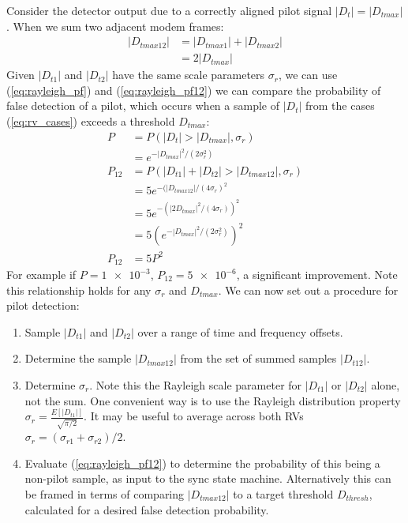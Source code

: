 \documentclass{article}
\begin{document}
Consider the detector output due to a correctly aligned pilot signal $|D_t|=|D_{tmax}|$. When we sum two adjacent modem frames:
\begin{equation}
\label{eq:pilot_sum}
\begin{split}
|D_{tmax12}| &= |D_{tmax1}| + |D_{tmax2}| \\
             &= 2|D_{tmax}|
\end{split}
\end{equation}
Given $|D_{t1}|$ and $|D_{t2}|$ have the same scale parameters $\sigma_r$, we can use (\ref{eq:rayleigh_pf}) and (\ref{eq:rayleigh_pf12}) we can compare the probability of false detection of a pilot, which occurs when a sample of $|D_t|$ from the cases (\ref{eq:rv_cases}) exceeds a threshold $D_{tmax}$:
\begin{equation}
\begin{split}
P &= P(|D_t|>|D_{tmax}|,\sigma_r) \\
  &= e^{-|D_{tmax}|^2/(2\sigma_r^2)} \\
P_{12} &= P(|D_{t1}|+|D_{t2}|>|D_{tmax12}|,\sigma_r) \\
       &= 5e^{-(|D_{tmax12}|/(4\sigma_r)^2} \\
       &= 5e^{-(|2D_{tmax}|^2/(4\sigma_r))^2} \\
       &= 5\left(e^{-|D_{tmax}|^2/(2\sigma_r^2)}\right)^2 \\
P_{12} &= 5P^2
\end{split}
\end{equation}
For example if $P=\num{1e-3}$, $P_{12}=\num{5e-6}$, a significant improvement. Note this relationship holds for any $\sigma_r$ and $D_{tmax}$. We can now set out a procedure for pilot detection:
\begin{enumerate}
\item Sample $|D_{t1}|$ and $|D_{t2}|$ over a range of time and frequency offsets.
\item Determine the sample $|D_{tmax12}|$ from the set of summed samples $|D_{t12}|$.
\item Determine $\sigma_r$.  Note this the Rayleigh scale parameter for $|D_{t1}|$ or $|D_{t2}|$ alone, not the sum. One convenient way is to use the Rayleigh distribution property $\sigma_r=\frac{E[|D_{t1}|]}{\sqrt{\pi/2}} $. It may be useful to average across both RVs $\sigma_r=(\sigma_{r1}+\sigma_{r2})/2$.
\item Evaluate (\ref{eq:rayleigh_pf12}) to determine the probability of this being a non-pilot sample, as input to the sync state machine.  Alternatively this can be framed in terms of comparing $|D_{tmax12}|$ to a target threshold $D_{thresh}$, calculated for a desired false detection probability.
\end{enumerate}
\end{document}
